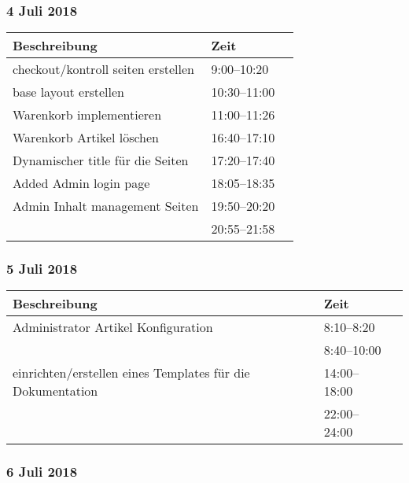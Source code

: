 \documentclass[a4paper, 11pt]{article}
\begin{document}
\subsubsection{4 Juli 2018}

\begin{tabular}{llr}
\toprule
Beschreibung & Zeit \\
\midrule
checkout/kontroll seiten erstellen & 9:00--10:20 \\
base layout erstellen & 10:30--11:00 \\
Warenkorb implementieren & 11:00--11:26 \\
Warenkorb Artikel löschen & 16:40--17:10 \\
Dynamischer title für die Seiten & 17:20--17:40 \\
Added Admin login page & 18:05--18:35 \\
Admin Inhalt management Seiten & 19:50--20:20 \\
 & 20:55--21:58 \\
\bottomrule
\end{tabular}

\subsubsection{5 Juli 2018}

\begin{tabular}{llr}
\toprule
Beschreibung & Zeit \\
\midrule
Administrator Artikel Konfiguration & 8:10--8:20 \\
 & 8:40--10:00 \\
einrichten/erstellen eines Templates für die Dokumentation & 14:00--18:00 \\
 & 22:00--24:00 \\
\bottomrule
\end{tabular}

\subsubsection{6 Juli 2018}
\end{document}
